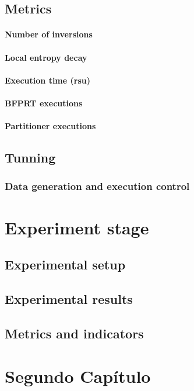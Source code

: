 \documentclass{iccmemoria}
\begin{document}
\section{Metrics}
\subsubsection{Number of inversions}
\subsubsection{Local entropy decay}
\subsubsection{Execution time (rsu)}
\subsubsection{BFPRT executions}
\subsubsection{Partitioner executions}
\section{Tunning}
\subsection{Data generation and execution control}


\chapter{Experiment stage}
\section{Experimental setup}
\section{Experimental results}
\section{Metrics and indicators}


\chapter{Segundo Capítulo}
\end{document}
